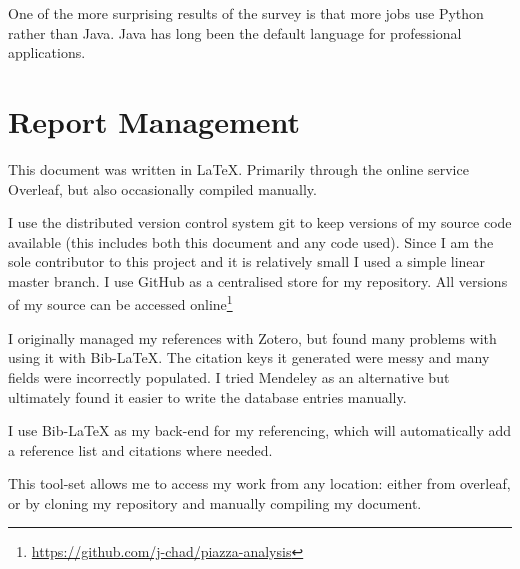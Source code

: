 \documentclass{scrartcl}
\begin{document}
One of the more surprising results of the survey is that more jobs use Python rather than Java. Java has long been the default language for professional applications.



\section{Report Management}
This document was written in \LaTeX. Primarily through the online service Overleaf, but also occasionally compiled manually.

I use the distributed version control system git to keep versions of my source code available (this includes both this document and any code used). Since I am the sole contributor to this project and it is relatively small I used a simple linear master branch. I use GitHub as a centralised store for my repository. All versions of my source can be accessed online\footnote{\url{https://github.com/j-chad/piazza-analysis}}

I originally managed my references with Zotero, but found many problems with using it with Bib-\LaTeX{}. The citation keys it generated were messy and many fields were incorrectly populated. I tried Mendeley as an alternative but ultimately found it easier to write the database entries manually.

I use Bib-\LaTeX{} as my back-end for my referencing, which will automatically add a reference list and citations where needed.

This tool-set allows me to access my work from any location: either from overleaf, or by cloning my repository and manually compiling my document.

\printnoidxglossary[type=\acronymtype]
\printbibliography
\end{document}
